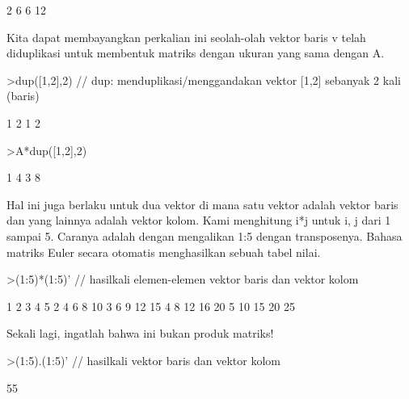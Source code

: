 \documentclass[a4paper,10pt]{article}
\begin{document}
\begin{eulernotebook}
\begin{euleroutput}
              2             6 
              6            12 
\end{euleroutput}
\begin{eulercomment}
Kita dapat membayangkan perkalian ini seolah-olah vektor baris v telah
diduplikasi untuk membentuk matriks dengan ukuran yang sama dengan A.
\end{eulercomment}
\begin{eulerprompt}
>dup([1,2],2) // dup: menduplikasi/menggandakan vektor [1,2] sebanyak 2 kali (baris)
\end{eulerprompt}
\begin{euleroutput}
              1             2 
              1             2 
\end{euleroutput}
\begin{eulerprompt}
>A*dup([1,2],2) 
\end{eulerprompt}
\begin{euleroutput}
              1             4 
              3             8 
\end{euleroutput}
\begin{eulercomment}
Hal ini juga berlaku untuk dua vektor di mana satu vektor adalah
vektor baris dan yang lainnya adalah vektor kolom. Kami menghitung i*j
untuk i, j dari 1 sampai 5. Caranya adalah dengan mengalikan 1:5
dengan transposenya. Bahasa matriks Euler secara otomatis menghasilkan
sebuah tabel nilai.
\end{eulercomment}
\begin{eulerprompt}
>(1:5)*(1:5)' // hasilkali elemen-elemen vektor baris dan vektor kolom
\end{eulerprompt}
\begin{euleroutput}
              1             2             3             4             5 
              2             4             6             8            10 
              3             6             9            12            15 
              4             8            12            16            20 
              5            10            15            20            25 
\end{euleroutput}
\begin{eulercomment}
Sekali lagi, ingatlah bahwa ini bukan produk matriks!
\end{eulercomment}
\begin{eulerprompt}
>(1:5).(1:5)' // hasilkali vektor baris dan vektor kolom
\end{eulerprompt}
\begin{euleroutput}
  55
\end{euleroutput}

\end{eulernotebook}
\end{document}
